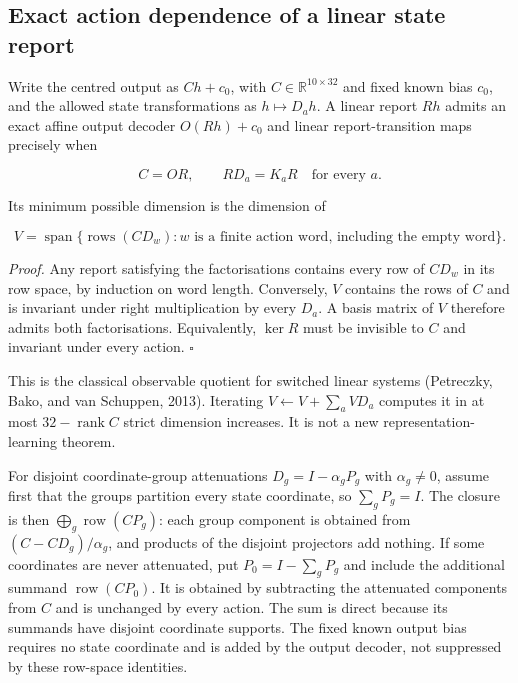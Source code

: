 \documentclass[
  british,
  11pt,
  a4paper,
]{article}
\begin{document}
\subsection{Exact action dependence of a linear state
report}\label{exact-action-dependence-of-a-linear-state-report}

Write the centred output as \(Ch+c_0\), with
\(C\in\mathbb R^{10\times32}\) and fixed known bias \(c_0\), and the
allowed state transformations as \(h\mapsto D_a h\). A linear report
\(Rh\) admits an exact affine output decoder \(O(Rh)+c_0\) and linear
report-transition maps precisely when

\[C=OR,\qquad RD_a=K_aR\quad\text{for every }a.\]

Its minimum possible dimension is the dimension of

\[V=\operatorname{span}\{\operatorname{rows}(CD_w):w\text{ is a finite action word, including the empty word}\}.\]

\emph{Proof.} Any report satisfying the factorisations contains every
row of \(CD_w\) in its row space, by induction on word length.
Conversely, \(V\) contains the rows of \(C\) and is invariant under
right multiplication by every \(D_a\). A basis matrix of \(V\) therefore
admits both factorisations. Equivalently, \(\ker R\) must be invisible
to \(C\) and invariant under every action. \(\square\)

This is the classical observable quotient for switched linear systems
(Petreczky, Bako, and van Schuppen, 2013). Iterating
\(V\leftarrow V+\sum_aVD_a\) computes it in at most
\(32-\operatorname{rank}C\) strict dimension increases. It is not a new
representation-learning theorem.

For disjoint coordinate-group attenuations \(D_g=I-\alpha_gP_g\) with
\(\alpha_g\ne0\), assume first that the groups partition every state
coordinate, so \(\sum_gP_g=I\). The closure is then
\(\bigoplus_g\operatorname{row}(CP_g)\): each group component is
obtained from \((C-CD_g)/\alpha_g\), and products of the disjoint
projectors add nothing. If some coordinates are never attenuated, put
\(P_0=I-\sum_gP_g\) and include the additional summand
\(\operatorname{row}(CP_0)\). It is obtained by subtracting the
attenuated components from \(C\) and is unchanged by every action. The
sum is direct because its summands have disjoint coordinate supports.
The fixed known output bias requires no state coordinate and is added by
the output decoder, not suppressed by these row-space identities.
\end{document}
